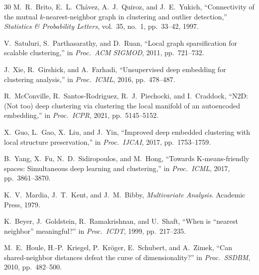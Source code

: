\documentclass[journal]{IEEEtran}
\begin{document}
\begin{thebibliography}{30}
M.~R.~Brito, E.~L.~Ch\'{a}vez, A.~J.~Quiroz, and J.~E.~Yukich, ``Connectivity of the mutual $k$-nearest-neighbor graph in clustering and outlier detection,'' \emph{Statistics \& Probability Letters}, vol.~35, no.~1, pp.~33--42, 1997.

V.~Satuluri, S.~Parthasarathy, and D.~Ruan, ``Local graph sparsification for scalable clustering,'' in \emph{Proc.\ ACM SIGMOD}, 2011, pp.~721--732.

J.~Xie, R.~Girshick, and A.~Farhadi, ``Unsupervised deep embedding for clustering analysis,'' in \emph{Proc.\ ICML}, 2016, pp.~478--487.

R.~McConville, R.~Santos-Rodriguez, R.~J.~Piechocki, and I.~Craddock, ``N2D: (Not too) deep clustering via clustering the local manifold of an autoencoded embedding,'' in \emph{Proc.\ ICPR}, 2021, pp.~5145--5152.

X.~Guo, L.~Gao, X.~Liu, and J.~Yin, ``Improved deep embedded clustering with local structure preservation,'' in \emph{Proc.\ IJCAI}, 2017, pp.~1753--1759.

B.~Yang, X.~Fu, N.~D.~Sidiropoulos, and M.~Hong, ``Towards K-means-friendly spaces: Simultaneous deep learning and clustering,'' in \emph{Proc.\ ICML}, 2017, pp.~3861--3870.

K.~V.~Mardia, J.~T.~Kent, and J.~M.~Bibby, \emph{Multivariate Analysis}. Academic Press, 1979.

K.~Beyer, J.~Goldstein, R.~Ramakrishnan, and U.~Shaft, ``When is ``nearest neighbor'' meaningful?'' in \emph{Proc.\ ICDT}, 1999, pp.~217--235.

M.~E.~Houle, H.-P.~Kriegel, P.~Kr\"{o}ger, E.~Schubert, and A.~Zimek, ``Can shared-neighbor distances defeat the curse of dimensionality?'' in \emph{Proc.\ SSDBM}, 2010, pp.~482--500.

\end{thebibliography}
\end{document}
